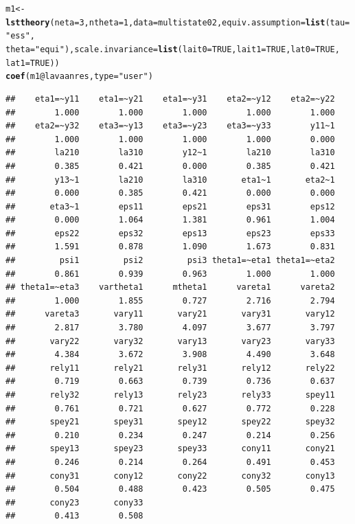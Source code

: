 \documentclass[10pt]{article}\usepackage{graphicx, color}
\makeatletter
\newcommand{\hlfunctioncall}[1]{\textcolor[rgb]{0.501960784313725,0,0.329411764705882}{\textbf{#1}}}%
\newcommand{\hlstring}[1]{\textcolor[rgb]{0.6,0.6,1}{#1}}%
\newenvironment{kframe}{%
 \def\at@end@of@kframe{}%
 \ifinner\ifhmode%
  \def\at@end@of@kframe{\end{minipage}}%
  \begin{minipage}{\columnwidth}%
 \fi\fi%
 \def\FrameCommand##1{\hskip\@totalleftmargin \hskip-\fboxsep
 \colorbox{shadecolor}{##1}\hskip-\fboxsep
     \hskip-\linewidth \hskip-\@totalleftmargin \hskip\columnwidth}%
 \MakeFramed {\advance\hsize-\width
   \@totalleftmargin\z@ \linewidth\hsize
   \@setminipage}}%
 {\par\unskip\endMakeFramed%
 \at@end@of@kframe}
\newenvironment{knitrout}{}{} %
\makeatother
\begin{document}
\begin{knitrout}
\color{fgcolor}\begin{kframe}
\begin{alltt}
m1 <- \hlfunctioncall{lsttheory}(neta = 3, ntheta = 1, data = multistate02, equiv.assumption = \hlfunctioncall{list}(tau = \hlstring{"ess"}, 
    theta = \hlstring{"equi"}), scale.invariance = \hlfunctioncall{list}(lait0 = TRUE, lait1 = TRUE, lat0 = TRUE, 
    lat1 = TRUE))
\hlfunctioncall{coef}(m1@lavaanres, type = \hlstring{"user"})
\end{alltt}
\begin{verbatim}
##    eta1=~y11    eta1=~y21    eta1=~y31    eta2=~y12    eta2=~y22 
##        1.000        1.000        1.000        1.000        1.000 
##    eta2=~y32    eta3=~y13    eta3=~y23    eta3=~y33        y11~1 
##        1.000        1.000        1.000        1.000        0.000 
##        la210        la310        y12~1        la210        la310 
##        0.385        0.421        0.000        0.385        0.421 
##        y13~1        la210        la310       eta1~1       eta2~1 
##        0.000        0.385        0.421        0.000        0.000 
##       eta3~1        eps11        eps21        eps31        eps12 
##        0.000        1.064        1.381        0.961        1.004 
##        eps22        eps32        eps13        eps23        eps33 
##        1.591        0.878        1.090        1.673        0.831 
##         psi1         psi2         psi3 theta1=~eta1 theta1=~eta2 
##        0.861        0.939        0.963        1.000        1.000 
## theta1=~eta3    vartheta1      mtheta1      vareta1      vareta2 
##        1.000        1.855        0.727        2.716        2.794 
##      vareta3       vary11       vary21       vary31       vary12 
##        2.817        3.780        4.097        3.677        3.797 
##       vary22       vary32       vary13       vary23       vary33 
##        4.384        3.672        3.908        4.490        3.648 
##       rely11       rely21       rely31       rely12       rely22 
##        0.719        0.663        0.739        0.736        0.637 
##       rely32       rely13       rely23       rely33       spey11 
##        0.761        0.721        0.627        0.772        0.228 
##       spey21       spey31       spey12       spey22       spey32 
##        0.210        0.234        0.247        0.214        0.256 
##       spey13       spey23       spey33       cony11       cony21 
##        0.246        0.214        0.264        0.491        0.453 
##       cony31       cony12       cony22       cony32       cony13 
##        0.504        0.488        0.423        0.505        0.475 
##       cony23       cony33 
##        0.413        0.508
\end{verbatim}
\end{kframe}
\end{knitrout}
\end{document}

